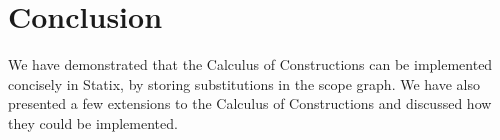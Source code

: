 \documentclass[a4paper,UKenglish,cleveref, autoref, thm-restate]{oasics-v2021}
\begin{document}
\section{Conclusion}

We have demonstrated that the Calculus of Constructions can be implemented concisely in Statix, by storing substitutions in the scope graph. We have also presented a few extensions to the Calculus of Constructions and discussed how they could be implemented.


\end{document}
